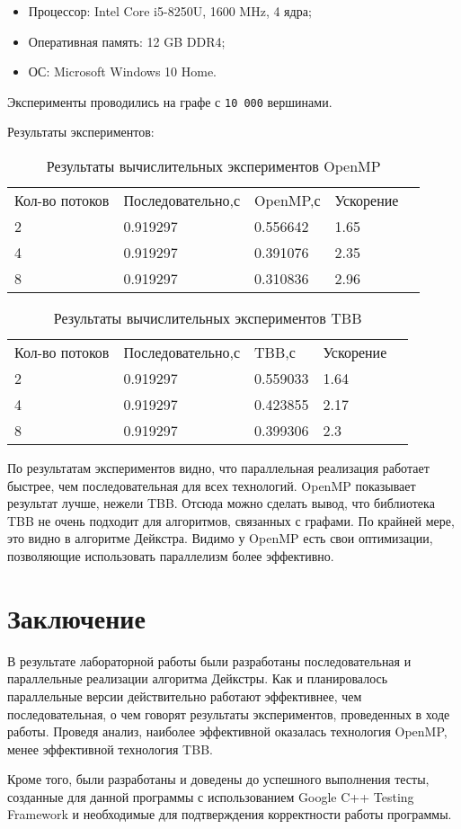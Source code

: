 \documentclass{report}
\begin{document}
\begin{itemize}
\item Процессор: Intel Core i5-8250U, 1600 MHz, 4 ядра;
\item Оперативная память: 12 GB DDR4;
\item ОС: Microsoft Windows 10 Home.
\end{itemize}

\par Эксперименты проводились на графе с \verb|10 000| вершинами. 
\par Результаты экспериментов:
\begin{table}[!h]
\centering
\begin{tabular}{lllll}
Кол-во потоков & Последовательно,с & OpenMP,с & Ускорение  \\
2 & 0.919297 & 0.556642 & 1.65  \\
4 & 0.919297 & 0.391076 & 2.35  \\
8 & 0.919297 & 0.310836 & 2.96 
\end{tabular}
\caption{Результаты вычислительных экспериментов OpenMP}
\end{table}

\begin{table}[!h]
\centering
\begin{tabular}{lllll}
Кол-во потоков & Последовательно,с & TBB,с & Ускорение  \\
2 & 0.919297 & 0.559033 & 1.64  \\
4 & 0.919297 & 0.423855 & 2.17  \\
8 & 0.919297 & 0.399306 & 2.3 
\end{tabular}
\caption{Результаты вычислительных экспериментов TBB}
\end{table}


\par По результатам экспериментов видно, что параллельная реализация работает быстрее, чем последовательная для всех технологий. OpenMP показывает результат лучше, нежели TBB. Отсюда можно сделать вывод, что библиотека TBB не очень подходит для алгоритмов, связанных с графами. По крайней мере, это видно в алгоритме Дейкстра. Видимо у OpenMP есть свои оптимизации, позволяющие использовать параллелизм более эффективно.
\newpage


\section*{Заключение}
В результате лабораторной работы были разработаны последовательная и параллельные реализации алгоритма Дейкстры.
Как и планировалось параллельные версии действительно работают эффективнее, чем последовательная, о чем говорят результаты экспериментов, проведенных в ходе работы.
Проведя анализ, наиболее эффективной оказалась технология OpenMP, менее эффективной технология TBB.
\par Кроме того, были разработаны и доведены до успешного выполнения тесты, созданные для данной программы с использованием Google C++ Testing Framework и необходимые для подтверждения корректности работы программы.
\end{document}
